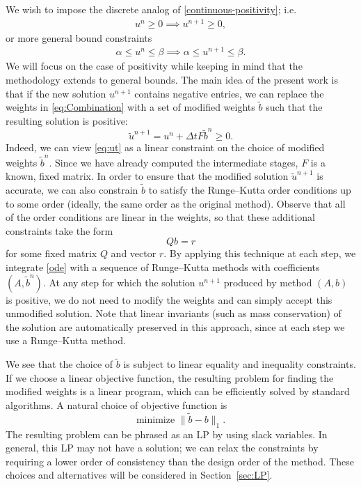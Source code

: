 \documentclass[a4paper]{article}
\numberwithin{equation}{section}
\theoremstyle{plain}
\theoremstyle{definition}
\numberwithin{theorem}{section}
\newcommand{\dt}{{\Delta t}}
\newcommand{\1}{\mathbbm{1}}
\newcommand{\ut}{\tilde{u}}
\newcommand{\bt}{\tilde{b}}
\begin{document}
We wish to impose the discrete analog of \eqref{continuous-positivity}; i.e.
\begin{align} \label{positivity}
    u^n\ge 0 \implies u^{n+1} \ge 0,
\end{align}
or more general bound constraints
\begin{align}
    \alpha \le u^n\le \beta \implies \alpha \le u^{n+1} \le \beta.
\end{align}
We will focus on the case of positivity while keeping in mind that
the methodology extends to general bounds.
The main idea of the present work is that if the new solution $u^{n+1}$ contains
negative entries, we can replace the weights in \eqref{eq:Combination} with
a set of modified weights $\bt$ such that the resulting solution is positive:
\begin{equation}\label{eq:ut}
\ut^{n+1} = u^n + \dt F \bt^n \ge 0.
\end{equation}
Indeed, we can view \eqref{eq:ut} as a linear constraint on the choice of
modified weights $\bt^n$.  Since we have already computed the intermediate stages,
$F$ is a known, fixed matrix.  In order to ensure that the modified solution $\ut^{n+1}$
is accurate, we can also constrain $\bt$ to satisfy the Runge--Kutta order conditions
up to some order (ideally, the same order as the original method).  Observe that
all of the order conditions are linear in the weights, so that these additional constraints
take the form
$$
Qb = r
$$
for some fixed matrix $Q$ and vector $r$.
By applying this technique at each step, we integrate \eqref{ode} with a
sequence of Runge--Kutta methods with coefficients $(A,\bt^n)$.  At any step
for which the solution $u^{n+1}$ produced by method $(A,b)$ is positive, we do not
need to modify the weights and can simply accept this unmodified solution.
Note that linear invariants (such as mass conservation) of the solution are
automatically preserved in this approach, since at each step we use a Runge--Kutta
method.

We see that the choice of $\bt$ is subject to linear equality and inequality
constraints.  If we choose a linear objective function, the resulting problem
for finding the modified weights is a linear program, which can be efficiently
solved by standard algorithms.  A natural choice of objective function is
$$
\text{minimize } \|\bt - b\|_1.
$$
The resulting problem can be phrased as an LP by using slack variables.
In general, this LP may not have a solution; we can relax the constraints
by requiring a lower order of consistency than the design order of the
method.  These choices and alternatives will be considered in Section~\ref{sec:LP}.
\end{document}
